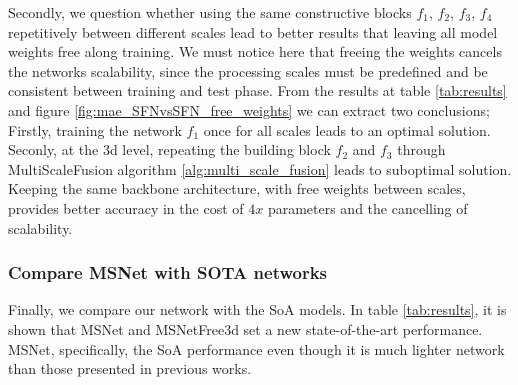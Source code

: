 \documentclass[10pt]{article}
\begin{document}
Secondly, we question whether using the same constructive blocks $f_1$, $f_2$, $f_3$, $f_4$ repetitively between different scales lead to better results that leaving all model weights free along training. We must notice here that freeing the weights cancels the networks scalability, since the processing scales must be predefined and be consistent between training and test phase. From the results at table \ref{tab:results} and figure \ref{fig:mae_SFNvsSFN_free_weights} we can extract two conclusions; Firstly, training the network $f_1$ once for all scales leads to an optimal solution. Seconly, at the 3d level, repeating the building block $f_2$ and $f_3$ through MultiScaleFusion algorithm \ref{alg:multi_scale_fusion} leads to suboptimal solution. Keeping the same backbone architecture, with free weights between scales, provides better accuracy in the cost of $4x$ parameters and the cancelling of scalability.

\subsubsection{Compare MSNet with SOTA networks}

Finally, we compare our network with the SoA models. In table \ref{tab:results}, it is shown that MSNet and MSNetFree3d set a new state-of-the-art performance. MSNet, specifically, the SoA performance even though it is much lighter network than those presented in previous works.
\end{document}
